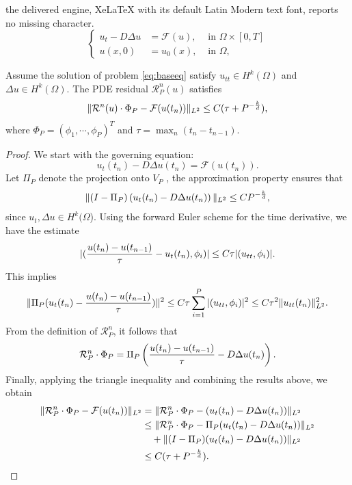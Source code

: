 \documentclass[10pt,a4paper]{amsart}
\begin{document}
the delivered engine, XeLaTeX with its default Latin Modern text font, reports no missing character.
\begin{equation}\label{eq:baseeq}
	\left\{
	\begin{aligned}
		u_t-D\Delta u&= \mathcal{F}(u), & \text{ in }\Omega\times [0,T]\\
		u(x,0) &= u_0(x), &\text{ in }\Omega,
	\end{aligned}\right.
\end{equation}

\begin{lemma}\label{thm:residual}
	Assume the solution of problem \eqref{eq:baseeq} satisfy $u_{tt}\in H^k(\Omega)$ and $\Delta u \in H^k(\Omega)$. The PDE residual $\mathcal{R}_P^n(u)$ satisfies
	\begin{equation}
		\|\mathcal{R}^n(u)\cdot \Phi_P-\mathcal{F}(u(t_n))\|_{L^2}\le C(\tau + P^{-{k\over d}}),
	\end{equation}
	where $\Phi_P=(\phi_1,\cdots,\phi_P)^T$ and $\tau=\max_n(t_n-t_{n-1})$.
\end{lemma}

\begin{proof}
	We start with the governing equation:
	$$
	u_t(t_n)-D\Delta u(t_n) = \mathcal{F}(u(t_n)).
	$$
	Let  $\Pi_P$ denote the projection onto $V_P$ , the approximation property ensures that
	$$
	\|(I-\Pi_P)\left(u_t(t_n) -D\Delta u(t_n) \right)\|_{L^2} \le CP^{-{k\over d}},
	$$ 
	since $u_t,\Delta u\in H^k(\Omega$). Using the forward Euler scheme for the time derivative, we have the estimate
	$$
	|({u(t_n)-u(t_{n-1})\over \tau}-u_t(t_n),\phi_i)| \le C\tau |(u_{tt},\phi_i)|.
	$$
	This implies 
	$$
	\|\Pi_P (u_t(t_n) - {u(t_n)-u(t_{n-1})\over \tau})\|^2 \le C\tau\sum_{i=1}^P |(u_{tt},\phi_i)|^2 \le C\tau^2 \|u_{tt}(t_n)\|_{L^2}^2.
	$$
	From the definition of $\mathcal{R}_P^n$, it follows that
	$$
	\mathcal{R}_P^n\cdot\Phi_P=\Pi_P \left({u(t_n)-u(t_{n-1})\over \tau}-D\Delta u(t_n)\right).
	$$
	Finally, applying the triangle inequality and combining the results above, we obtain
	$$
	\begin{aligned}
		\|\mathcal{R}_P^n\cdot\Phi_P-\mathcal{F}(u(t_n))\|_{L^2} &=\|\mathcal{R}_P^n\cdot\Phi_P-(u_t(t_n)-D\Delta u(t_n))\|_{L^2}\\
		&\le \|\mathcal{R}_P^n\cdot\Phi_P - \Pi_P (u_t(t_n)-D\Delta u(t_n))\|_{L^2}\\
        &\quad+ \|(I-\Pi_P )(u_t(t_n)-D\Delta u(t_n))\|_{L^2}\\
		&\le C(\tau +P^{-{k\over d}}).
	\end{aligned}
	$$
\end{proof}
\end{document}
